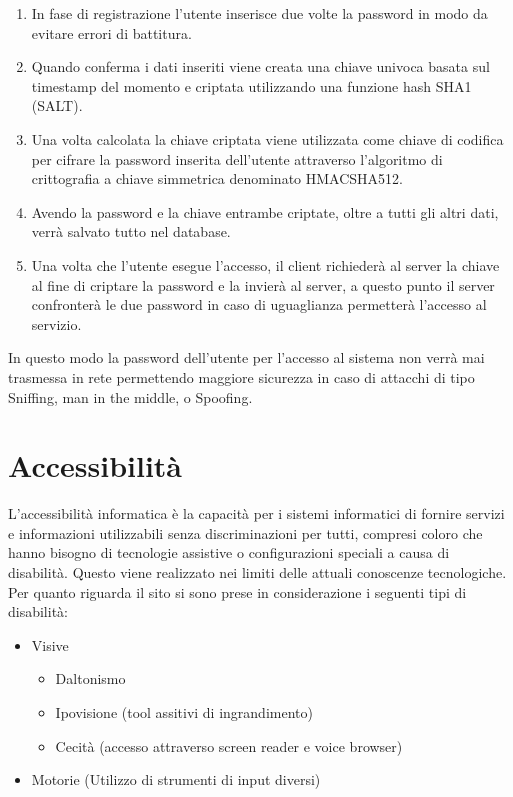 \documentclass[a4paper,final,12pt]{report}
\begin{document}
\begin{enumerate}
\item In fase di registrazione l'utente inserisce due volte la password in modo da evitare errori di battitura.
\item Quando conferma i dati inseriti viene creata una chiave univoca basata sul timestamp del momento e criptata utilizzando una funzione hash SHA1 (SALT).
\item Una volta calcolata la chiave criptata viene utilizzata come chiave di codifica per cifrare la password inserita dell'utente attraverso l'algoritmo di crittografia a chiave simmetrica denominato HMACSHA512. 
\item Avendo la password e la chiave entrambe criptate, oltre a tutti gli altri dati, verrà salvato tutto nel database.
\item Una volta che l'utente esegue l'accesso, il client richiederà al server la chiave al fine di criptare la password e la invierà al server, a questo punto il server confronterà le due password in caso di uguaglianza permetterà l'accesso al servizio.
\end{enumerate}
In questo modo la password dell'utente per l'accesso al sistema non verrà mai trasmessa in rete permettendo maggiore sicurezza in caso di attacchi di tipo Sniffing, man in the middle, o Spoofing.  

\section{Accessibilità}
L'accessibilità informatica è la capacità per i sistemi informatici di fornire servizi e informazioni utilizzabili senza discriminazioni per tutti, compresi coloro che hanno bisogno di tecnologie assistive o configurazioni speciali a causa di disabilità. Questo viene realizzato nei limiti delle attuali conoscenze tecnologiche. Per quanto riguarda il sito si sono prese in considerazione i seguenti tipi di disabilità:
\begin{itemize}
\item Visive
\begin{itemize}
\item Daltonismo
\item Ipovisione (tool assitivi di ingrandimento)
\item Cecità (accesso attraverso screen reader e voice browser)
\end{itemize}
\item Motorie (Utilizzo di strumenti di input diversi)
\end{itemize}
\end{document}
